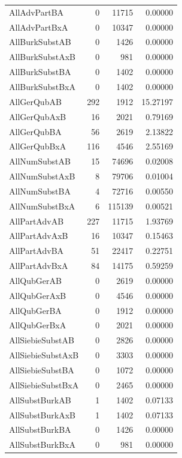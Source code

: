 \begin{table}[t]
\begin{tabular}{|l|r|r|r|}
        AllAdvPartBA & 0 & 11715 & 0.00000 \\
        AllAdvPartBxA & 0 & 10347 & 0.00000 \\
        AllBurkSubstAB & 0 & 1426 & 0.00000 \\
        AllBurkSubstAxB & 0 & 981 & 0.00000 \\
        AllBurkSubstBA & 0 & 1402 & 0.00000 \\
        AllBurkSubstBxA & 0 & 1402 & 0.00000 \\
        AllGerQubAB & 292 & 1912 & 15.27197 \\
        AllGerQubAxB & 16 & 2021 & 0.79169 \\
        AllGerQubBA & 56 & 2619 & 2.13822 \\
        AllGerQubBxA & 116 & 4546 & 2.55169 \\
        AllNumSubstAB & 15 & 74696 & 0.02008 \\
        AllNumSubstAxB & 8 & 79706 & 0.01004 \\
        AllNumSubstBA & 4 & 72716 & 0.00550 \\
        AllNumSubstBxA & 6 & 115139 & 0.00521 \\
        AllPartAdvAB & 227 & 11715 & 1.93769 \\
        AllPartAdvAxB & 16 & 10347 & 0.15463 \\
        AllPartAdvBA & 51 & 22417 & 0.22751 \\
        AllPartAdvBxA & 84 & 14175 & 0.59259 \\
        AllQubGerAB & 0 & 2619 & 0.00000 \\
        AllQubGerAxB & 0 & 4546 & 0.00000 \\
        AllQubGerBA & 0 & 1912 & 0.00000 \\
        AllQubGerBxA & 0 & 2021 & 0.00000 \\
        AllSiebieSubstAB & 0 & 2826 & 0.00000 \\
        AllSiebieSubstAxB & 0 & 3303 & 0.00000 \\
        AllSiebieSubstBA & 0 & 1072 & 0.00000 \\
        AllSiebieSubstBxA & 0 & 2465 & 0.00000 \\
        AllSubstBurkAB & 1 & 1402 & 0.07133 \\
        AllSubstBurkAxB & 1 & 1402 & 0.07133 \\
        AllSubstBurkBA & 0 & 1426 & 0.00000 \\
        AllSubstBurkBxA & 0 & 981 & 0.00000 \\

\end{tabular}
\end{table}
